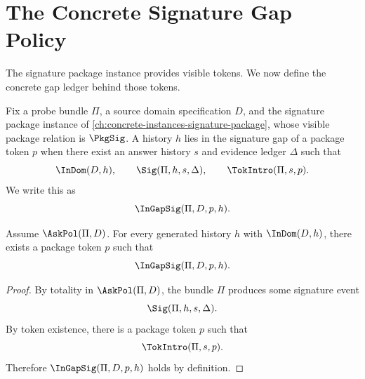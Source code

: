 \chapter{The Concrete Signature Gap Policy}
\label{ch:concrete-instances-gap-policy}

The signature package instance provides visible tokens. We now define the concrete gap ledger behind those tokens.

\begin{definition}
\label{def:signature-gap-membership}
\label{def:gap-membership}
Fix a probe bundle $\Pi$, a source domain specification $D$, and the signature package instance of \autoref{ch:concrete-instances-signature-package}, whose visible package relation is $\PkgSig$. A history $h$ lies in the signature gap of a package token $p$ when there exist an answer history $s$ and evidence ledger $\Delta$ such that
$$
  \InDom(D,h),
  \qquad
  \Sig(\Pi,h,s,\Delta),
  \qquad
  \TokIntro(\Pi,s,p).
$$
We write this as
$$
  \InGapSig(\Pi,D,p,h).
$$
\end{definition}

\begin{lemma}
\label{thm:concrete-gap-coverage}
Assume $\AskPol(\Pi,D)$. For every generated history $h$ with $\InDom(D,h)$, there exists a package token $p$ such that
$$
  \InGapSig(\Pi,D,p,h).
$$
\end{lemma}
\begin{proof}
By totality in $\AskPol(\Pi,D)$, the bundle $\Pi$ produces some signature event
$$
  \Sig(\Pi,h,s,\Delta).
$$
By token existence, there is a package token $p$ such that
$$
  \TokIntro(\Pi,s,p).
$$
Therefore $\InGapSig(\Pi,D,p,h)$ holds by definition.
\end{proof}

